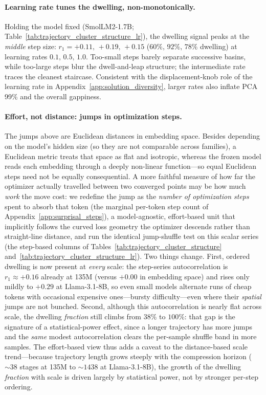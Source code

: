 \paragraph{Learning rate tunes the dwelling, non-monotonically.} Holding the model fixed (SmolLM2-1.7B; Table~\ref{tab:trajectory_cluster_structure_lr}), the dwelling signal peaks at the \emph{middle} step size: $r_1 = +0.11,\,+0.19,\,+0.15$ ($60\%,\,92\%,\,78\%$ dwelling) at learning rates $0.1,\,0.5,\,1.0$. Too-small steps barely separate successive basins, while too-large steps blur the dwell-and-leap structure; the intermediate rate traces the cleanest staircase. Consistent with the displacement-knob role of the learning rate in Appendix~\ref{app:solution_diversity}, larger rates also inflate PCA 99\% and the overall gappiness.

\paragraph{Effort, not distance: jumps in optimization steps.} The jumps above are Euclidean distances in embedding space. Besides depending on the model's hidden size (so they are not comparable across families), a Euclidean metric treats that space as flat and isotropic, whereas the frozen model reads each embedding through a deeply non-linear function---so equal Euclidean steps need not be equally consequential. A more faithful measure of how far the optimizer actually travelled between two converged points may be how much \emph{work} the move cost: we redefine the jump as the \emph{number of optimization steps} spent to absorb that token (the marginal per-token step count of Appendix~\ref{app:surprisal_steps}), a model-agnostic, effort-based unit that implicitly follows the curved loss geometry the optimizer descends rather than straight-line distance, and run the identical jump-shuffle test on this scalar series (the step-based columns of Tables~\ref{tab:trajectory_cluster_structure} and~\ref{tab:trajectory_cluster_structure_lr}). Two things change. First, ordered dwelling is now present at \emph{every} scale: the step-series autocorrelation is $r_1 \approx +0.16$ already at 135M (versus $+0.00$ in embedding space) and rises only mildly to $+0.29$ at Llama-3.1-8B, so even small models alternate runs of cheap tokens with occasional expensive ones---bursty difficulty---even where their \emph{spatial} jumps are not bunched. Second, although this autocorrelation is nearly flat across scale, the dwelling \emph{fraction} still climbs from $38\%$ to $100\%$: that gap is the signature of a statistical-power effect, since a longer trajectory has more jumps and the \emph{same} modest autocorrelation clears the per-sample shuffle band in more samples. The effort-based view thus adds a caveat to the distance-based scale trend---because trajectory length grows steeply with the compression horizon (${\sim}38$ stages at 135M to ${\sim}1438$ at Llama-3.1-8B), the growth of the dwelling \emph{fraction} with scale is driven largely by statistical power, not by stronger per-step ordering.

